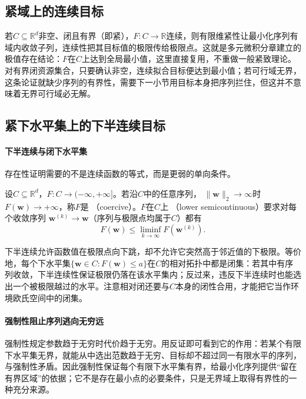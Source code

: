 \subsection{紧域上的连续目标}

若$C\subseteq\mathbb R^d$非空、闭且有界（即紧），$F:C\to\mathbb R$连续，则有限维紧性让最小化序列有域内收敛子列，连续性把其目标值的极限传给极限点。这就是多元微积分章建立的极值存在结论：$F$在$C$上达到全局最小值，这里直接复用，不重做一般紧致理论。对有界闭资源集合，只要确认非空，连续拟合目标便达到最小值；若可行域无界，这条论证就缺少序列的有界性，需要下一小节用目标本身把序列拦住，但这并不意味着无界可行域必无解。

\subsection{紧下水平集上的下半连续目标}

\paragraph{下半连续与闭下水平集}

存在性证明需要的不是连续函数的等式，而是更弱的单向条件。

\begin{definition}[强制性与下半连续性]
\label{def:opt-coercive-lower-semicontinuous}
设$C\subseteq\mathbb R^d$，$F:C\to(-\infty,+\infty]$。若沿$C$中的任意序列，
$\lVert\bm{w}\rVert_2\to\infty$时$F(\bm{w})\to+\infty$，称$F$是
（coercive）。$F$在$C$上
（lower semicontinuous）要求对每个收敛序列
$\bm{w}^{(k)}\to\bm{w}$（序列与极限点均属于$C$）都有
\[
  F(\bm{w})\leq\liminf_{k\to\infty}F(\bm{w}^{(k)}).
\]
\end{definition}

下半连续允许函数值在极限点向下跳，却不允许它突然高于邻近值的下极限。等价地，每个下水平集$\{\bm w\in C:F(\bm w)\leq a\}$在$C$的相对拓扑中都是闭集：若其中有序列收敛，下半连续性保证极限仍落在该水平集内；反过来，违反下半连续时也能选出一个被极限越过的水平。注意相对闭还要与$C$本身的闭性合用，才能把它当作环境欧氏空间中的闭集。

\paragraph{强制性阻止序列逃向无穷远}

强制性规定参数趋于无穷时代价趋于无穷。用反证即可看到它的作用：若某个有限下水平集无界，就能从中选出范数趋于无穷、目标却不超过同一有限水平的序列，与强制性矛盾。因此强制性保证每个有限下水平集有界，给最小化序列提供“留在有界区域”的依据；它不是存在最小点的必要条件，只是无界域上取得有界性的一种充分来源。

